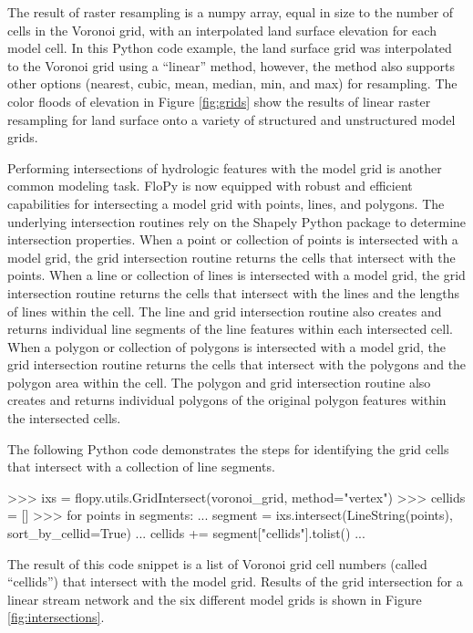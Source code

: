 \documentclass[11pt, oneside]{article}  	%
\begin{document}
\noindent The result of raster resampling is a numpy array, equal in size to the number of cells in the Voronoi grid, with an interpolated land surface elevation for each model cell. In this Python code example, the land surface grid was interpolated to the Voronoi grid using a ``linear'' method, however, the method also supports other options (nearest, cubic, mean, median, min, and max) for resampling. The color floods of elevation in Figure \ref{fig:grids} show the results of linear raster resampling for land surface onto a variety of structured and unstructured model grids.

Performing intersections of hydrologic features with the model grid is another common modeling task. FloPy is now equipped with robust and efficient capabilities for intersecting a model grid with points, lines, and polygons. The underlying intersection routines rely on the Shapely Python package \citep{shapely-gillies} to determine intersection properties. When a point or collection of points is intersected with a model grid, the grid intersection routine returns the cells that intersect with the points. When a line or collection of lines is intersected with a model grid, the grid intersection routine returns the cells that intersect with the lines and the lengths of lines within the cell. The line and grid intersection routine also creates and returns individual line segments of the line features within each intersected cell. When a polygon or collection of polygons is intersected with a model grid, the grid intersection routine returns the cells that intersect with the polygons and the polygon area within the cell. The polygon and grid intersection routine also creates and returns individual polygons of the original polygon features within the intersected cells.

The following Python code demonstrates the steps for identifying the grid cells that intersect with a collection of line segments.

\begin{python}
>>> ixs = flopy.utils.GridIntersect(voronoi_grid, method="vertex")
>>> cellids = []
>>> for points in segments:
...   segment = ixs.intersect(LineString(points), sort_by_cellid=True)
...   cellids += segment["cellids"].tolist()
...
\end{python}

\noindent The result of this code snippet is a list of Voronoi grid cell numbers (called ``cellids'') that intersect with the model grid.  Results of the grid intersection for a linear stream network and the six different model grids is shown in Figure \ref{fig:intersections}.
\end{document}
